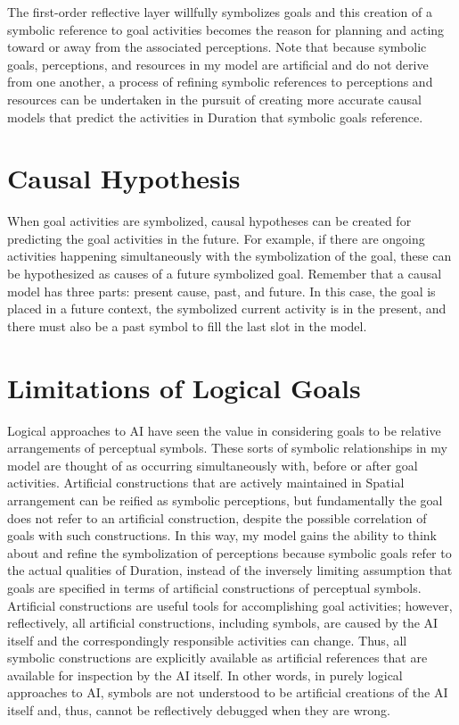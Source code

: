 The first-order reflective layer willfully symbolizes goals and this
creation of a symbolic reference to goal activities becomes the reason
for planning and acting toward or away from the associated
perceptions.  Note that because symbolic goals, perceptions, and
resources in my model are artificial and do not derive from one
another, a process of refining symbolic references to perceptions and
resources can be undertaken in the pursuit of creating more accurate
causal models that predict the activities in Duration that symbolic
goals reference.

\section{Causal Hypothesis}

When goal activities are symbolized, causal hypotheses can be created
for predicting the goal activities in the future.  For example, if
there are ongoing activities happening simultaneously with the
symbolization of the goal, these can be hypothesized as causes of a
future symbolized goal.  Remember that a causal model has three parts:
present cause, past, and future.  In this case, the goal is placed in
a future context, the symbolized current activity is in the present,
and there must also be a past symbol to fill the last slot in the
model.

\section{Limitations of Logical Goals}

Logical approaches to AI have seen the value in considering goals to
be relative arrangements of perceptual symbols.  These sorts of
symbolic relationships in my model are thought of as occurring
simultaneously with, before or after goal activities.  Artificial
constructions that are actively maintained in Spatial arrangement can
be reified as symbolic perceptions, but fundamentally the goal does
not refer to an artificial construction, despite the possible
correlation of goals with such constructions.  In this way, my model
gains the ability to think about and refine the symbolization of
perceptions because symbolic goals refer to the actual qualities of
Duration, instead of the inversely limiting assumption that goals are
specified in terms of artificial constructions of perceptual symbols.
Artificial constructions are useful tools for accomplishing goal
activities; however, reflectively, all artificial constructions,
including symbols, are caused by the AI itself and the correspondingly
responsible activities can change.  Thus, all symbolic constructions
are explicitly available as artificial references that are available
for inspection by the AI itself.  In other words, in purely logical
approaches to AI, symbols are not understood to be artificial
creations of the AI itself and, thus, cannot be reflectively debugged
when they are wrong.

